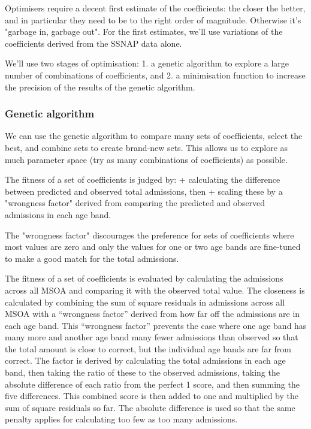 \documentclass[12pt]{extarticle}
\begin{document}
Optimisers require a decent first estimate of the coefficients: the closer the better, and in particular they need to be to the right order of magnitude. Otherwise it's "garbage in, garbage out". For the first estimates, we'll use variations of the coefficients derived from the SSNAP data alone.

We'll use two stages of optimisation:
1. a genetic algorithm to explore a large number of combinations of coefficients, and
2. a minimisation function to increase the precision of the results of the genetic algorithm.



\subsubsection{Genetic algorithm}

We can use the genetic algorithm to compare many sets of coefficients, select the best, and combine sets to create brand-new sets. This allows us to explore as much parameter space (try as many combinations of coefficients) as possible.

The fitness of a set of coefficients is judged by:
+ calculating the difference between predicted and observed total admissions, then
+ scaling these by a "wrongness factor" derived from comparing the predicted and observed admissions in each age band.

The "wrongness factor" discourages the preference for sets of coefficients where most values are zero and only the values for one or two age bands are fine-tuned to make a good match for the total admissions. 

The fitness of a set of coefficients is evaluated by calculating the admissions across all MSOA and comparing it with the observed total value. The closeness is calculated by combining the sum of square residuals in admissions across all MSOA with a ``wrongness factor'' derived from how far off the admissions are in each age band.
This ``wrongness factor'' prevents the case where one age band has many more and another age band many fewer admissions than observed so that the total amount is close to correct, but the individual age bands are far from correct.
The factor is derived by calculating the total admissions in each age band, then taking the ratio of these to the observed admissions, taking the absolute difference of each ratio from the perfect 1 score, and then summing the five differences. This combined score is then added to one and multiplied by the sum of square residuals so far.
The absolute difference is used so that the same penalty applies for calculating too few as too many admissions.
\end{document}
